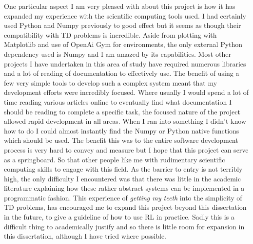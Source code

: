 \documentclass[hidelinks,journal]{IEEEtran}
\begin{document}
One particular aspect I am very pleased with about this project is how it has expanded my experience with the scientific computing tools used. I had certainly used Python and Numpy previously to good effect but it seems as though their compatibility with TD problems is incredible. Aside from plotting with Matplotlib and use of OpenAi Gym for environments, the only external Python dependency used is Numpy and I am amazed by its capabilities. Most other projects I have undertaken in this area of study have required numerous libraries and a lot of reading of documentation to effectively use. The benefit of using a few very simple tools to develop such a complex system meant that my development efforts were incredibly focused. Where usually I would spend a lot of time reading various articles online to eventually find what documentation I should be reading to complete a specific task, the focused nature of the project allowed rapid development in all areas. When I ran into something I didn’t know how to do I could almost instantly find the Numpy or Python native functions which should be used. The benefit this was to the entire software development process is very hard to convey and measure but I hope that this project can serve as a springboard. So that other people like me with rudimentary scientific computing skills to engage with this field. As the barrier to entry is not terribly high, the only difficulty I encountered was that there was little in the academic literature explaining how these rather abstract systems can be implemented in a programmatic fashion. This experience of \textit{getting my teeth} into the simplicity of TD problems, has encouraged me to expand this project beyond this dissertation in the future, to give a guideline of how to use RL in practice. Sadly this is a difficult thing to academically justify and so there is little room for expansion in this dissertation, although I have tried where possible.
\end{document}
